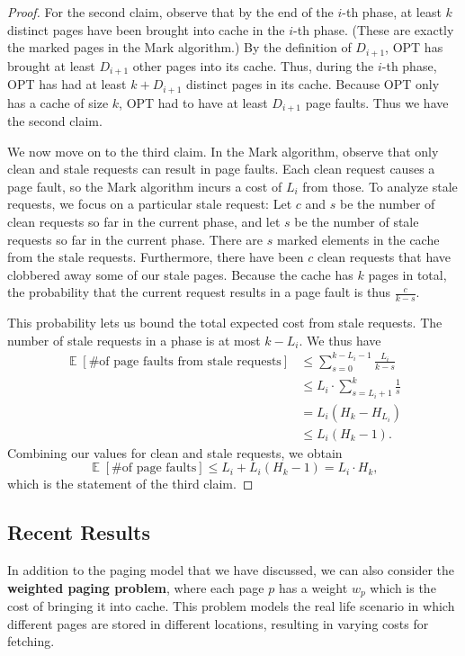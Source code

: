 \documentclass[11pt]{article}
\DeclareMathOperator*{\E}{\mathbb{E}}
\begin{document}
\begin{proof}
  For the second claim, observe that by the end of the $i$-th phase, at least $k$ distinct pages have been brought into cache in the $i$-th phase. (These are exactly the marked pages in the Mark algorithm.) By the definition of $D_{i+1}$, OPT has brought at least $D_{i+1}$ other pages into its cache. Thus, during the $i$-th phase, OPT has had at least $k + D_{i+1}$ distinct pages in its cache. Because OPT only has a cache of size $k$, OPT had to have at least $D_{i+1}$ page faults. Thus we have the second claim.

  We now move on to the third claim. In the Mark algorithm, observe that only clean and stale requests can result in page faults. Each clean request causes a page fault, so the Mark algorithm incurs a cost of $L_i$ from those. To analyze stale requests, we focus on a particular stale request: Let $c$ and $s$ be the number of clean requests so far in the current phase, and let $s$ be the number of stale requests so far in the current phase. There are $s$ marked elements in the cache from the stale requests. Furthermore, there have been $c$ clean requests that have clobbered away some of our stale pages. Because the cache has $k$ pages in total, the probability that the current request results in a page fault is thus $\frac{c}{k-s}$.

  This probability lets us bound the total expected cost from stale requests. The number of stale requests in a phase is at most $k - L_i$. We thus have
  \begin{align*}
    \E[\text{\# of page faults from stale requests}]
    &\le \sum_{s=0}^{k-L_i-1} \frac{L_i}{k-s} \\
    &\le L_i\cdot\sum_{s=L_i+1}^k \frac 1s \\
    &= L_i(H_k - H_{L_i}) \\
    &\le L_i(H_k-1).
  \end{align*}
  Combining our values for clean and stale requests, we obtain
  \[ \E[\text{\# of page faults}] \le L_i + L_i(H_k - 1) = L_i\cdot H_k, \]
  which is the statement of the third claim.
\end{proof}

\subsection{Recent Results}

In addition to the paging model that we have discussed, we can also consider the \textbf{weighted paging problem}, where each page $p$ has a weight $w_p$ which is the cost of bringing it into cache. This problem models the real life scenario in which different pages are stored in different locations, resulting in varying costs for fetching.
\end{document}
